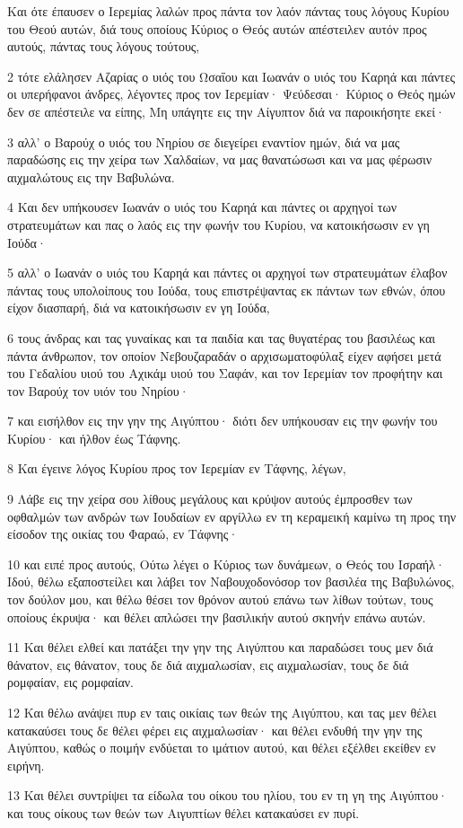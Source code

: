 \par Και ότε έπαυσεν ο Ιερεμίας λαλών προς πάντα τον λαόν πάντας τους λόγους Κυρίου του Θεού αυτών, διά τους οποίους Κύριος ο Θεός αυτών απέστειλεν αυτόν προς αυτούς, πάντας τους λόγους τούτους,
\par 2 τότε ελάλησεν Αζαρίας ο υιός του Ωσαΐου και Ιωανάν ο υιός του Καρηά και πάντες οι υπερήφανοι άνδρες, λέγοντες προς τον Ιερεμίαν· Ψεύδεσαι· Κύριος ο Θεός ημών δεν σε απέστειλε να είπης, Μη υπάγητε εις την Αίγυπτον διά να παροικήσητε εκεί·
\par 3 αλλ' ο Βαρούχ ο υιός του Νηρίου σε διεγείρει εναντίον ημών, διά να μας παραδώσης εις την χείρα των Χαλδαίων, να μας θανατώσωσι και να μας φέρωσιν αιχμαλώτους εις την Βαβυλώνα.
\par 4 Και δεν υπήκουσεν Ιωανάν ο υιός του Καρηά και πάντες οι αρχηγοί των στρατευμάτων και πας ο λαός εις την φωνήν του Κυρίου, να κατοικήσωσιν εν γη Ιούδα·
\par 5 αλλ' ο Ιωανάν ο υιός του Καρηά και πάντες οι αρχηγοί των στρατευμάτων έλαβον πάντας τους υπολοίπους του Ιούδα, τους επιστρέψαντας εκ πάντων των εθνών, όπου είχον διασπαρή, διά να κατοικήσωσιν εν γη Ιούδα,
\par 6 τους άνδρας και τας γυναίκας και τα παιδία και τας θυγατέρας του βασιλέως και πάντα άνθρωπον, τον οποίον Νεβουζαραδάν ο αρχισωματοφύλαξ είχεν αφήσει μετά του Γεδαλίου υιού του Αχικάμ υιού του Σαφάν, και τον Ιερεμίαν τον προφήτην και τον Βαρούχ τον υιόν του Νηρίου·
\par 7 και εισήλθον εις την γην της Αιγύπτου· διότι δεν υπήκουσαν εις την φωνήν του Κυρίου· και ήλθον έως Τάφνης.
\par 8 Και έγεινε λόγος Κυρίου προς τον Ιερεμίαν εν Τάφνης, λέγων,
\par 9 Λάβε εις την χείρα σου λίθους μεγάλους και κρύψον αυτούς έμπροσθεν των οφθαλμών των ανδρών των Ιουδαίων εν αργίλλω εν τη κεραμεική καμίνω τη προς την είσοδον της οικίας του Φαραώ, εν Τάφνης·
\par 10 και ειπέ προς αυτούς, Ούτω λέγει ο Κύριος των δυνάμεων, ο Θεός του Ισραήλ· Ιδού, θέλω εξαποστείλει και λάβει τον Ναβουχοδονόσορ τον βασιλέα της Βαβυλώνος, τον δούλον μου, και θέλω θέσει τον θρόνον αυτού επάνω των λίθων τούτων, τους οποίους έκρυψα· και θέλει απλώσει την βασιλικήν αυτού σκηνήν επάνω αυτών.
\par 11 Και θέλει ελθεί και πατάξει την γην της Αιγύπτου και παραδώσει τους μεν διά θάνατον, εις θάνατον, τους δε διά αιχμαλωσίαν, εις αιχμαλωσίαν, τους δε διά ρομφαίαν, εις ρομφαίαν.
\par 12 Και θέλω ανάψει πυρ εν ταις οικίαις των θεών της Αιγύπτου, και τας μεν θέλει κατακαύσει τους δε θέλει φέρει εις αιχμαλωσίαν· και θέλει ενδυθή την γην της Αιγύπτου, καθώς ο ποιμήν ενδύεται το ιμάτιον αυτού, και θέλει εξέλθει εκείθεν εν ειρήνη.
\par 13 Και θέλει συντρίψει τα είδωλα του οίκου του ηλίου, του εν τη γη της Αιγύπτου· και τους οίκους των θεών των Αιγυπτίων θέλει κατακαύσει εν πυρί.

